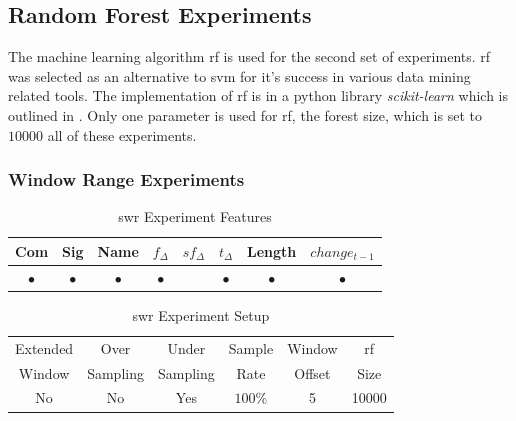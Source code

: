 \subsection{Random Forest Experiments}
\label{sec:rf_experiments}

The machine learning algorithm \gls{rf} is used for the second set of experiments. \gls{rf} was selected as an alternative to \gls{svm} for it's success in various data mining related tools. The implementation of \gls{rf} is in a python library \textit{scikit-learn} which is outlined in . Only one parameter is used for \gls{rf}, the forest size, which is set to $10000$ all of these experiments.

\subsubsection{Window Range Experiments}
\label{sec:rf_swr_experiment}

\begin{table}[h]
\begin{center}

    \begin{tabular}{|c|c|c|c|c|c|c|c|}
        \hline
        Com & Sig & Name & $f_{\Delta}$ & $sf_{\Delta}$ & $t_\Delta$ & Length & $change_{t-1}$ \\
         \hline
        $\bullet$ & $\bullet$ & $\bullet$ & $\bullet$ & & $\bullet$ & $\bullet$ & $\bullet$ \\ \hline
    \end{tabular}
    \caption{\gls{swr} Experiment Features}
    \label{tab:rf_window_range_experiment_features}
\end{center}

\end{table}

\begin{table}[h]
\begin{center}

    \begin{tabular}{|c|c|c|c|c|c|}
        \hline
        Extended & Over & Under & Sample & Window & \gls{rf} \\
        Window & Sampling & Sampling & Rate & Offset & Size \\ \hline
        No & No & Yes & $100\%$ & 5 & 10000 \\ \hline
    \end{tabular}
    \caption{\gls{swr} Experiment Setup}
    \label{tab:rf_window_range_experiment_setup}
\end{center}

\end{table}

